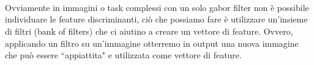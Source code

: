 \documentclass{article}
\begin{document}
\begin{figure}[H]
    \centering
    \\
    \\
    \\
    \caption{}
    \label{fig:gaborEg}
\end{figure}

Ovviamente in immagini o task complessi con un solo gabor filter non è possibile individuare le feature discriminanti, ciò che possiamo fare è utilizzare un'insieme di filtri (bank of filters) che ci aiutino a creare un vettore di feature. Ovvero, applicando un filtro su un'immagine otterremo in output una nuova immagine che può essere ``appiattita" e utilizzata come vettore di feature.
\end{document}
